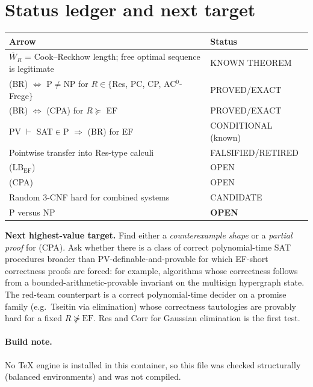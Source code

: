 \documentclass[11pt]{article}
\theoremstyle{definition}
\newcommand{\Wb}{\overline W}
\begin{document}
\section{Status ledger and next target}
\begin{center}
\begin{tabular}{ll}\toprule
Arrow & Status\\\midrule
$\Wb_R$ = Cook--Reckhow length; free optimal sequence is legitimate & KNOWN THEOREM\\
(BR) $\Leftrightarrow$ P$\ne$NP for $R\in\{$Res, PC, CP, AC$^0$-Frege$\}$ & PROVED/EXACT\\
(BR) $\Leftrightarrow$ (CPA) for $R\succeq$ EF & PROVED/EXACT\\
PV $\vdash$ SAT$\in$P $\Rightarrow$ (BR) for EF & CONDITIONAL (known)\\
Pointwise transfer into Res-type calculi & FALSIFIED/RETIRED\\
(LB$_{\mathrm{EF}}$) & OPEN\\
(CPA) & OPEN\\
Random 3-CNF hard for combined systems & CANDIDATE\\\midrule
P versus NP & \textbf{OPEN}\\\bottomrule
\end{tabular}
\end{center}
\textbf{Next highest-value target.} Find either a \emph{counterexample shape} or a
\emph{partial proof} for (CPA). Ask whether there is a class of correct polynomial-time
SAT procedures broader than PV-definable-and-provable for which EF-short correctness
proofs are forced: for example, algorithms whose correctness follows from a
bounded-arithmetic-provable invariant on the multisign hypergraph state. The red-team
counterpart is a correct polynomial-time decider on a promise family (e.g.\ Tseitin via
elimination) whose correctness tautologies are provably hard for a fixed
$R\not\succeq\mathrm{EF}$. Res and $\mathrm{Corr}$ for Gaussian elimination is the first
test.

\paragraph{Build note.} No TeX engine is installed in this container, so this file was
checked structurally (balanced environments) and was not compiled.
\end{document}
